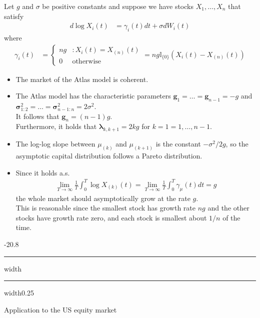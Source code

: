 \documentclass[a4paper,landscape,8pt,fleqn]{scrartcl}
\makeatletter
\renewcommand{\subsection}{\@startsection{subsection}{1}{0mm}%
{-2\baselineskip}{0.8\baselineskip}%
{\hrule depth 0.2pt width\columnwidth\hrule depth0.75pt
width0.25\columnwidth\vspace*{1.2em}\large\bfseries}}
\makeatother
\begin{document}
\begin{multicols*}{3}
Let $g$ and $\sigma$ be positive constants and suppose we have stocks $X_1, \ldots, X_n$ that satisfy
\begin{align*}
d \log X_i(t) &= \gamma_i(t) dt + \sigma dW_i(t)
\end{align*}
where
\begin{align*}
\gamma_i(t) &=
\begin{cases}
ng & : X_i(t) = X_{(n)}(t) \\
0 & \text{otherwise}
\end{cases}
= n g \mathbb{I}_{\lbrace 0 \rbrace} \left( X_i(t) - X_{(n)}(t) \right)
\end{align*}

\begin{itemize}
\item The market of the Atlas model is coherent.
\item The Atlas model has the characteristic parameters $\pmb{g}_1 = \ldots = \pmb{g}_{n-1} = -g$ and $\pmb{\sigma}_{1:2}^2 = \ldots = \pmb{\sigma}_{n-1:n}^2 = 2 \sigma^2$. \\
It follows that $\pmb{g}_n = (n-1)g$. \\
Furthermore, it holds that $\pmb{\lambda}_{k,k+1} = 2kg$ for $k = 1=1,\ldots,n-1$.
\item The log-log slope between $\mu_{(k)}$ and $\mu_{(k+1)}$ is the constant $-\sigma^2/2g$, so the asymptotic capital distribution follows a Pareto distribution.
\item Since it holds a.s.
\begin{align*}
\lim_{T \to \infty} \frac{1}{T} \int_0^T \log X_{(k)}(t) = \lim_{T \to \infty} \frac{1}{T} \int_0^T \gamma_\mu(t) dt = g
\end{align*}
the whole market should asymptotically grow at the rate $g$. \\
This is reasonable since the smallest stock has growth rate $ng$ and the other stocks have growth rate zero, and each stock is smallest about $1/n$ of the time.
\end{itemize}

\subsection{Application to the US equity market}


\end{multicols*}
\end{document}
